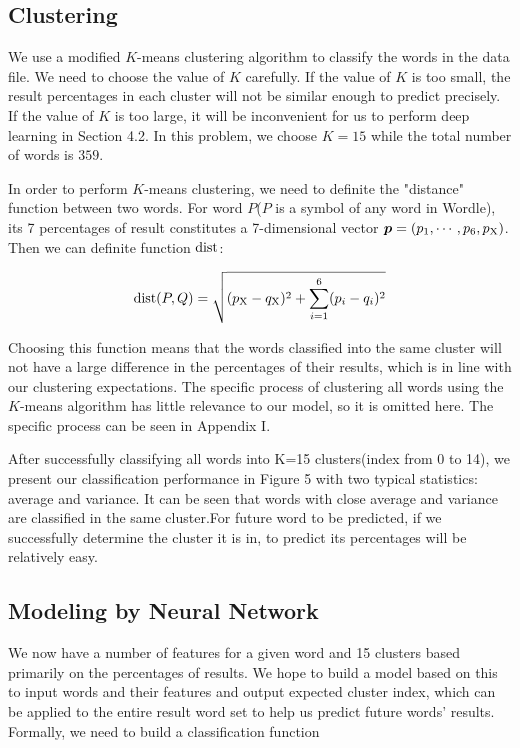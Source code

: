 \subsection{Clustering}

We use a modified $K$-means clustering algorithm to classify the words in the data file. We need to choose the value of $K$ carefully. If the value of $K$ is too small, the result percentages in each cluster will not be similar enough to predict precisely. If the value of $K$ is too large, it will be inconvenient for us to perform deep learning in Section 4.2. In this problem, we choose $K = 15$ while the total number of words is $359$.

In order to perform $K$-means clustering, we need to definite the "distance" function between two words. For word $P$($P$ is a symbol of any word in Wordle), its 7 percentages of result constitutes a 7-dimensional vector $\boldsymbol p= (p_1, \cdots, p_6, p_{\rm X})$. Then we can definite function $\rm{dist}$:

\begin{equation}
	\begin{aligned}
		{\rm dist}(P, Q) = \sqrt{(p_{\rm X}-q_{\rm X})^2 + \sum_{i=1}^6(p_i-q_i)^2}
	\end{aligned}
\end{equation}

Choosing this function means that the words classified into the same cluster will not have a large difference in the percentages of their results, which is in line with our clustering expectations. The specific process of clustering all words using the $K$-means algorithm has little relevance to our model, so it is omitted here. The specific process can be seen in Appendix I.


After successfully classifying all words into K=15 clusters(index from 0 to 14), we present our classification performance in Figure 5 with two typical statistics: average and variance. It can be seen that words with close average and variance are classified in the same cluster.For future word to be predicted, if we successfully determine the cluster it is in, to predict its percentages will be relatively easy.

\subsection{Modeling by Neural Network}

We now have a number of features for a given word and 15 clusters based primarily on the percentages of results. We hope to build a model based on this to input words and their features and output expected cluster index, which can be applied to the entire result word set to help us predict future words' results. Formally, we need to build a classification function

